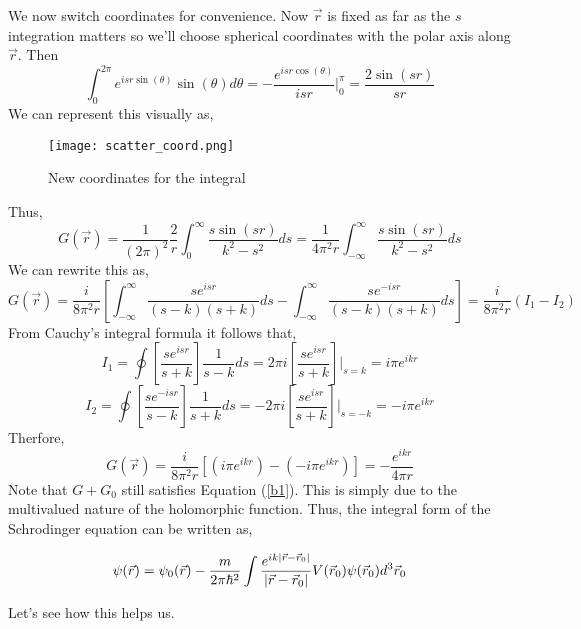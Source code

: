 We now switch coordinates for convenience. Now $\vec{r}$ is fixed as far as the $s$ integration matters so we'll choose spherical coordinates with the polar axis along $\vec{r}$. Then 
$$\int^{2 \pi}_{0} e^{isr \sin(\theta)} \sin(\theta) d \theta = - \frac{e^{isr \cos(\theta)}}{isr} \Big \rvert^{\pi}_{0} = \frac{2 \sin(sr)}{sr}$$
We can represent this visually as,
\begin{figure}[h]
	\centering
	\texttt{[image: scatter\_coord.png]}
	\caption{New coordinates for the integral}
\end{figure}
Thus,
$$G(\vec{r}) =  \frac{1}{{(2 \pi)}^{2}}\frac{2}{r} \int^{\infty}_{0} \frac{s \sin(sr)}{k^{2} - s^{2}} ds = \frac{1}{4 \pi^{2} r}\int^{\infty}_{-\infty} \frac{s \sin(sr)}{k^{2} - s^{2}} ds$$
We can rewrite this as,
$$G(\vec{r}) = \frac{i}{8 \pi^{2} r} \left[\int_{-\infty}^{\infty} \frac{se^{isr}}{(s-k)(s+k)} ds - \int_{-\infty}^{\infty} \frac{se^{-isr}}{(s-k)(s+k)} ds \right] = \frac{i}{8 \pi^{2} r}(I_{1}-I_{2})$$
From Cauchy's integral formula it follows that,
$$I_{1} = \oint \left[\frac{se^{isr}}{s + k} \right] \frac{1}{s-k}ds = 2 \pi i \left[ \frac{s e^{isr}}{s + k} \right] \Big \rvert_{{s= k}}  = i \pi e^{ikr}$$
$$I_{2} = \oint \left[\frac{se^{-isr}}{s - k} \right] \frac{1}{s+k}ds = -2 \pi i \left[ \frac{s e^{isr}}{s + k} \right] \Big \rvert_{{s= -k}}  = -i \pi e^{ikr}$$
Therfore,
\begin{equation} \label{b1}
G(\vec{r}) = \frac{i}{8 \pi^{2} r} \left[ \left(i \pi e^{ikr} \right) - \left(-i \pi e^{ikr} \right) \right] = -\frac{e^{ikr}}{4 \pi r}
\end{equation}
Note that $G + G_{0}$ still satisfies Equation (\ref{b1}). This is simply due to the multivalued nature of the holomorphic function. Thus, the integral form of the Schrodinger equation can be written as,
\begin{tcolorbox}
\begin{equation}
\psi(\vec{r}) = \psi_{0}(\vec{r}) - \frac{m}{2 \pi \hbar^{2}}\int\frac{e^{ik\abs{\vec{r} - \vec{r}_{0}}}}{\abs{\vec{r} - \vec{r}_{0}}}  V(\vec{r}_{0}) \psi(\vec{r}_{0}) d^{3}\vec{r}_{0}
\end{equation}
\end{tcolorbox}
Let's see how this helps us.
